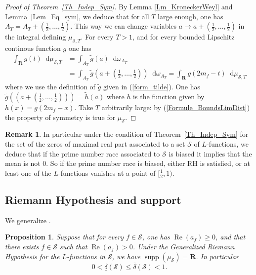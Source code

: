 \documentclass[a4paper,10pt]{amsart}
\theoremstyle{plain}
\newtheorem{prop}[theo]{Proposition}
\theoremstyle{definition}
\newtheorem{Rk}{Remark}
\begin{document}
\begin{proof}[Proof of Theorem~\ref{Th_Indep_Sym}]
By Lemma \ref{Lm_KroneckerWeyl} and Lemma~\ref{Lem_Eq_sym}, we deduce that for all $T$ large enough, one has $A_{T} = A_{T} + (\frac{1}{2},\ldots,\frac{1}{2})$.
This way we can change variables $a \rightarrow a + (\frac{1}{2},\ldots,\frac{1}{2})$ in the integral defining $\mu_{\mathcal{S},T}$.
For every $T>1$, and for every bounded Lipschitz continous function $g$ one has
\begin{align*}
\int_{\mathbf{R}}g(t){\mathop{}\!\mathrm{d}}\mu_{\mathcal{S},T} &=
\int_{A_{T}}\tilde{g}(a){\mathop{}\!\mathrm{d}}\omega_{A_{T}} \\
&= \int_{A_{T}}\tilde{g}\left(a+ \left(\frac{1}{2},\ldots,\frac{1}{2}\right)\right){\mathop{}\!\mathrm{d}}\omega_{A_{T}}
= \int_{\mathbf{R}}g(2m_{f}- t){\mathop{}\!\mathrm{d}}\mu_{\mathcal{S},T} 
\end{align*}
where we use the definition of $\tilde{g}$ given in (\ref{form_tilde}). 
One has $\tilde{g}((a+ (\frac{1}{2},\ldots,\frac{1}{2}))) = \tilde{h}(a)$ where $h$ is the function given by $h(x)=g(2m_{f} -x)$. 
Take $T$ arbitrarily large: by (\ref{Formule_BoundsLimDist}) the property of symmetry is true for $\mu_{\mathcal{S}}$.
\end{proof}

\begin{Rk}
In particular under the condition of Theorem~\ref{Th_Indep_Sym} for the set of the zeros of maximal real part associated to a set $\mathcal{S}$ of $L$-functions, we deduce that if the prime number race associated to $\mathcal{S}$ is biased it implies that the mean is not $0$.
So if the prime number race is biased, either RH is satisfied, or at least one of the $L$-functions vanishes at a point of $[\frac{1}{2},1)$.
\end{Rk}

\subsection{Riemann Hypothesis and support}\label{sub_Support}

We generalize \cite[Th. 1.2]{RS}.

\begin{prop}
Suppose that for every $f\in \mathcal{S}$, one has $\operatorname{Re}(a_{f})\geq 0$, and that there exists $f\in\mathcal{S}$ such that $\operatorname{Re}(a_{f})> 0$.
Under the Generalized Riemann Hypothesis for the $L$-functions in $\mathcal{S}$, we have $\operatorname{supp}(\mu_{\mathcal{S}}) = \mathbf{R}$.
In particular $$0<\underline{\delta}(\mathcal{S})\leq \overline{\delta}(\mathcal{S})<1.$$
\end{prop}
\end{document}
